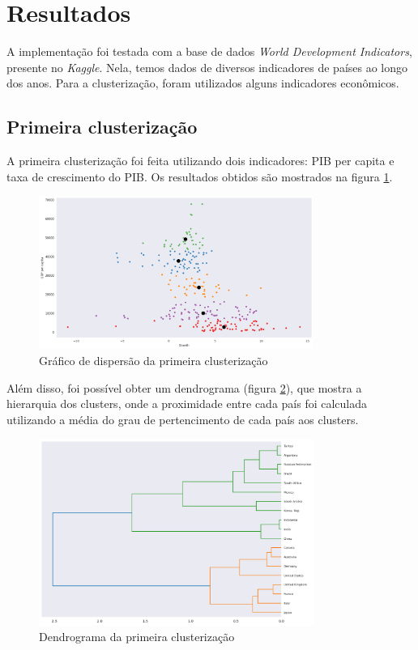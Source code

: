 \documentclass[a4paper, 11pt]{article}
\begin{document}
\section{Resultados}

A implementação foi testada com a base de dados \textit{World Development Indicators}, presente no \textit{Kaggle}\cite{kaggle_2017}.
Nela, temos dados de diversos indicadores de países ao longo dos anos.
Para a clusterização, foram utilizados alguns indicadores econômicos.

\subsection{Primeira clusterização}

A primeira clusterização foi feita utilizando dois indicadores: PIB per capita e taxa de crescimento do PIB.
Os resultados obtidos são mostrados na figura \ref{fig:cluster-1-plot}.

\begin{figure}[H]
    \centering
    \includegraphics[width=0.8\textwidth]{../images/scatter-cluster.png}
    \caption{Gráfico de dispersão da primeira clusterização}
    \label{fig:cluster-1-plot}
\end{figure}

Além disso, foi possível obter um dendrograma (figura \ref{fig:cluster-1-dendrogram}), que mostra a hierarquia dos clusters, onde a proximidade entre cada país foi calculada utilizando a média do grau de pertencimento de cada país aos clusters.

\begin{figure}[H]
    \centering
    \includegraphics[width=0.8\textwidth]{../images/dendrogram-economy-1.png}
    \caption{Dendrograma da primeira clusterização}
    \label{fig:cluster-1-dendrogram}
\end{figure}
\end{document}
